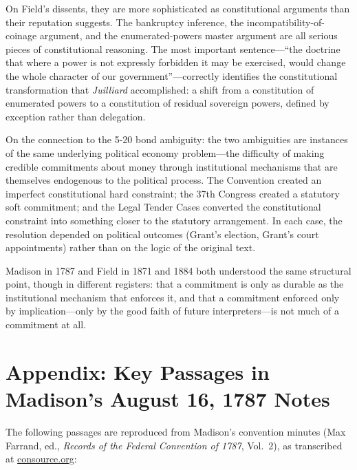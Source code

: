 \documentclass[12pt]{article}
\begin{document}
On Field's dissents, they are more sophisticated as constitutional
arguments than their reputation suggests. The bankruptcy inference,
the incompatibility-of-coinage argument, and the enumerated-powers
master argument are all serious pieces of constitutional reasoning.
The most important sentence---``the doctrine that where a power is
not expressly forbidden it may be exercised, would change the whole
character of our government''---correctly identifies the constitutional
transformation that \textit{Juilliard} accomplished: a shift from a
constitution of enumerated powers to a constitution of residual
sovereign powers, defined by exception rather than delegation.

On the connection to the 5-20 bond ambiguity: the two ambiguities are
instances of the same underlying political economy problem---the
difficulty of making credible commitments about money through
institutional mechanisms that are themselves endogenous to the
political process. The Convention created an imperfect constitutional
hard constraint; the 37th Congress created a statutory soft commitment;
and the Legal Tender Cases converted the constitutional constraint into
something closer to the statutory arrangement. In each case, the
resolution depended on political outcomes (Grant's election, Grant's
court appointments) rather than on the logic of the original text.

Madison in 1787 and Field in 1871 and 1884 both understood the same
structural point, though in different registers: that a commitment is
only as durable as the institutional mechanism that enforces it, and
that a commitment enforced only by implication---only by the good faith
of future interpreters---is not much of a commitment at all.

\section*{Appendix: Key Passages in Madison's August 16, 1787 Notes}

The following passages are reproduced from Madison's convention minutes
(Max Farrand, ed., \textit{Records of the Federal Convention of 1787},
Vol.~2), as transcribed at \url{consource.org}:
\end{document}

